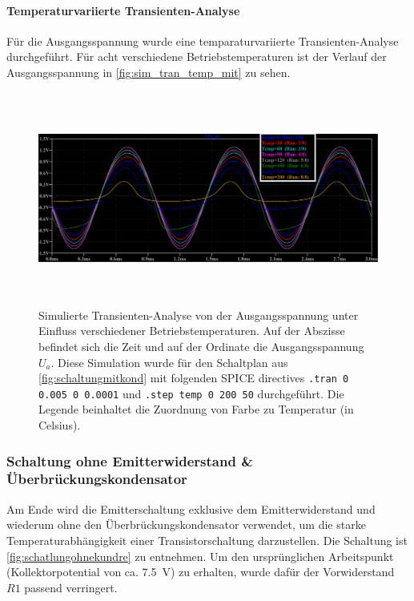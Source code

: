 \documentclass[12pt,english,ngerman]{scrartcl}
\begin{document}
\paragraph{Temperaturvariierte Transienten-Analyse}
Für die Ausgangsspannung wurde eine temparaturvariierte Transienten-Analyse durchgeführt. Für acht verschiedene Betriebstemperaturen ist der Verlauf der Ausgangsspannung in \autoref{fig:sim_tran_temp_mit} zu sehen.
\begin{figure}[H]
  \centering
    \includegraphics[width=\linewidth, height=7cm]{./figures/mitkond/ausgangmitkondtempsweep20mv.png }
    \caption[Simulierte Transienten-Analyse mit
    Überbrückungskondensator]{Simulierte Transienten-Analyse von der
      Ausgangsspannung unter Einfluss verschiedener Betriebstemperaturen. Auf
      der Abszisse befindet sich die Zeit und auf der Ordinate die
      Ausgangsspannung $U_a$. Diese Simulation wurde für den Schaltplan aus
    \autoref{fig:schaltungmitkond} mit folgenden SPICE directives \texttt{.tran
      0 0.005 0 0.0001} und \texttt{.step temp 0 200 50} durchgeführt. Die Legende
    beinhaltet die Zuordnung von Farbe zu Temperatur (in Celsius).}
  \label{fig:sim_tran_temp_mit}
\end{figure}



\subsubsection{Schaltung ohne Emitterwiderstand \& Überbrückungskondensator}
Am Ende wird die Emitterschaltung exklusive dem Emitterwiderstand und wiederum
ohne den Überbrückungskondensator verwendet, um die starke
Temperaturabhängigkeit einer Transistorschaltung darzustellen. Die Schaltung
ist  \autoref{fig:schatlungohnekundre} zu entnehmen. Um den ursprünglichen Arbeitspunkt (Kollektorpotential von ca. \SI{7,5}{\volt}) zu erhalten, wurde dafür der Vorwiderstand $R1$ passend verringert.
\end{document}
